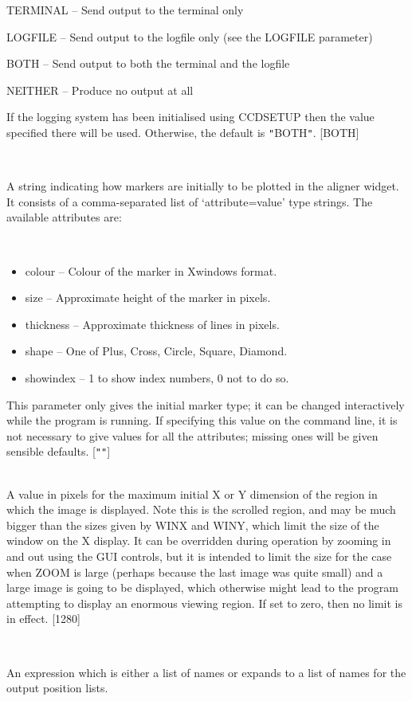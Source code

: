 \documentclass[twoside,11pt]{article}
\newcommand{\htmlref}[2]{#1}
\renewcommand{\_}{\texttt{\symbol{95}}}
\newcommand{\qt}[1]{{\tt "}#1{\tt "}}
\newcommand{\xroutine}[1]{\htmlref{{\sc #1}}{#1}}
\newcommand{\sstsubsection}[1]{ \item[{#1}] \mbox{} \\}
\newcommand{\sstitemlist}[1]{
  \mbox{} \\
  \vspace{-3.5ex}
  \begin{itemize}
     #1
  \end{itemize}
}
\newcommand{\sstitem}{\item}
\newcommand{\sstsubsection}[1]{\item[{#1}]}
\newcommand{\sstitemlist}[1]{
      \begin{itemize}
         #1
      \end{itemize}
      \\
   }
\newcommand{\sstitem}{\item}
\begin{document}
{{{{            \sstitem
               TERMINAL  -- Send output to the terminal only

            \sstitem
               LOGFILE   -- Send output to the logfile only (see the
                               LOGFILE parameter)

            \sstitem
               BOTH      -- Send output to both the terminal and the
                               logfile

            \sstitem
               NEITHER   -- Produce no output at all

         }
         If the logging system has been initialised using \xroutine{CCDSETUP}
         then the value specified there will be used. Otherwise, the
         default is \qt{BOTH}.
         [BOTH]
      }
      \sstsubsection{
         MARKSTYLE = LITERAL (Read and Write)
      }{
         A string indicating how markers are initially to be plotted in
         the aligner widget.  It consists of a comma-separated list of 
         `attribute=value' type strings.  The available attributes are:
          \sstitemlist{

            \sstitem
              colour     -- Colour of the marker in Xwindows format.

            \sstitem
              size       -- Approximate height of the marker in pixels.

            \sstitem
              thickness  -- Approximate thickness of lines in pixels.

            \sstitem
              shape      -- One of Plus, Cross, Circle, Square, Diamond.

            \sstitem
              showindex  -- 1 to show index numbers, 0 not to do so.
         }
         This parameter only gives the initial marker type; it can be
         changed interactively while the program is running.
         If specifying this value on the command line, it is not 
         necessary to give values for all the attributes; missing ones
         will be given sensible defaults.
         [\qt{}]
      }
      \sstsubsection{
         MAXCANV = \_INTEGER (Read and Write)
      } {
         A value in pixels for the maximum initial X or Y dimension of 
         the region in which the image is displayed.  Note this is the      
         scrolled region, and may be much bigger than the sizes given
         by WINX and WINY, which limit the size of the window on the
         X display.  It can be overridden during operation by zooming
         in and out using the GUI controls, but it is intended to
         limit the size for the case when ZOOM is large (perhaps
         because the last image was quite small) and a large image
         is going to be displayed, which otherwise might lead to
         the program attempting to display an enormous viewing region.
         If set to zero, then no limit is in effect.
         [1280]
      }
      \sstsubsection{
         OUTLIST = LITERAL (Read)
      } {
         An expression which is either a list of names or expands to a
         list of names for the output position lists.

}}}
\end{document}
